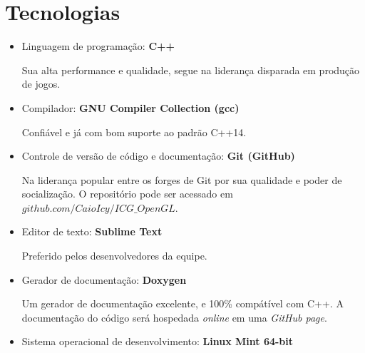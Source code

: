 \section{Tecnologias} 
\begin{itemize}
\item{Linguagem de programação:} \textbf{C++}

Sua alta performance e qualidade, segue na liderança disparada em produção de jogos.

\item{Compilador:} \textbf{GNU Compiler Collection (gcc)}

Confiável e já com bom suporte ao padrão C++14.

\item{Controle de versão de código e documentação:} \textbf{Git (GitHub)}

Na liderança popular entre os forges de Git por sua qualidade e poder de socialização. O repositório pode ser acessado em $github.com/CaioIcy/ICG\_OpenGL$.

\item{Editor de texto:} \textbf{Sublime Text}

Preferido pelos desenvolvedores da equipe.

\item{Gerador de documentação:} \textbf{Doxygen}

Um gerador de documentação excelente, e 100\% compátível com C++. A documentação do código será hospedada \textit{online} em uma \textit{GitHub page}.

\item{Sistema operacional de desenvolvimento:} \textbf{Linux Mint 64-bit}

\end{itemize}

